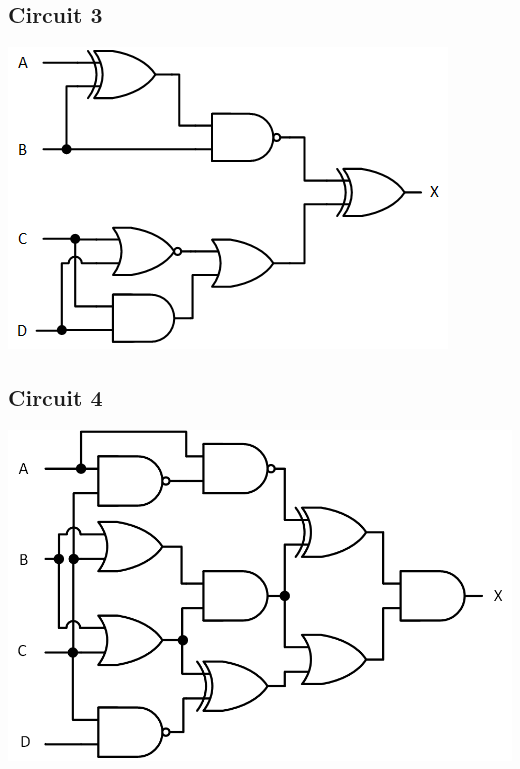 \documentclass[11pt,a4paper]{article}
\begin{document}
\subsection*{Circuit 3}


\centerline{
\includegraphics[scale=1.45]{./img/logique_combinatoire/circuit_logique_3.png}
}

\medskip

\subsection*{Circuit 4}


\centerline{
\includegraphics[scale=1.45]{./img/logique_combinatoire/circuit_logique_4.png}
}


\clearpage

\end{document}
